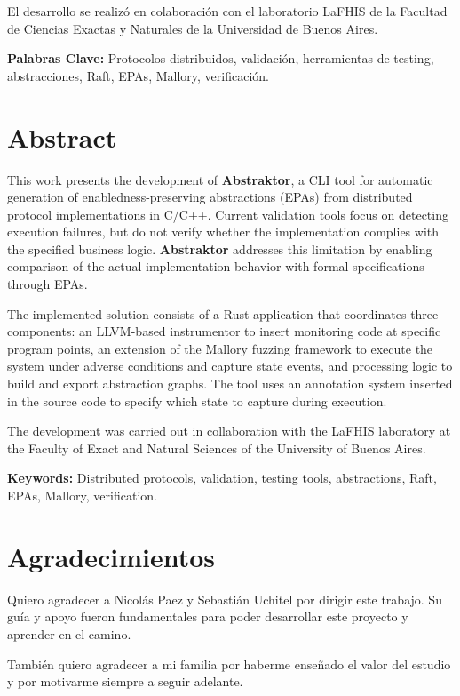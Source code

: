 \documentclass[12pt]{article}
\begin{document}
El desarrollo se realizó en colaboración con el laboratorio LaFHIS de la Facultad de Ciencias Exactas y Naturales de la Universidad de Buenos Aires.

\bigskip

\textbf{Palabras Clave:} Protocolos distribuidos, validación, herramientas de testing, abstracciones, Raft, EPAs, Mallory, verificación.

\bigskip

\section{Abstract}
This work presents the development of \textbf{Abstraktor}, a CLI tool for automatic generation of enabledness-preserving abstractions (EPAs) from distributed protocol implementations in C/C++. Current validation tools focus on detecting execution failures, but do not verify whether the implementation complies with the specified business logic. \textbf{Abstraktor} addresses this limitation by enabling comparison of the actual implementation behavior with formal specifications through EPAs.

The implemented solution consists of a Rust application that coordinates three components: an LLVM-based instrumentor to insert monitoring code at specific program points, an extension of the Mallory fuzzing framework to execute the system under adverse conditions and capture state events, and processing logic to build and export abstraction graphs. The tool uses an annotation system inserted in the source code to specify which state to capture during execution.

The development was carried out in collaboration with the LaFHIS laboratory at the Faculty of Exact and Natural Sciences of the University of Buenos Aires.

\bigskip

\textbf{Keywords:} Distributed protocols, validation, testing tools, abstractions, Raft, EPAs, Mallory, verification.


\clearpage


\section{Agradecimientos}

Quiero agradecer a Nicolás Paez y Sebastián Uchitel por dirigir este trabajo. Su guía y apoyo fueron fundamentales para poder desarrollar este proyecto y aprender en el camino.

También quiero agradecer a mi familia por haberme enseñado el valor del estudio y por motivarme siempre a seguir adelante.
\end{document}
